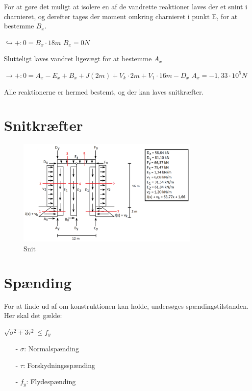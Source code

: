 For at gøre det muligt at isolere en af de vandrette reaktioner laves der et snint i charnieret, og derefter tages der moment omkring charnieret i punkt E, for at bestemme $B_x$.
\begin{center}
	$\hookrightarrow+: 0 = B_x \cdot 18m$
	\newline
	$B_x = 0N$
\end{center}

Slutteligt laves vandret ligevægt for at bestemme $A_x$
\begin{center}
	$\rightarrow+: 0 = A_x - E_x + B_x + J(2m) + V_k \cdot 2m + V_1 \cdot 16 m - D_x$
	\newline
	$A_x = -1,\!33 \cdot 10^5N$
\end{center} 

Alle reaktionerne er hermed bestemt, og der kan laves snitkræfter.

\section{Snitkræfter}

\begin{figure}[htbp]
	\centering
	\includegraphics[width=0.8\textwidth]{billeder/snitbrud.png}
	\caption{Snit}
	\label{fig:snitbrud}
\end{figure}

\section{Spænding}
For at finde ud af om konstruktionen kan holde, undersøges spændingstilstanden. Her skal det gælde:

\begin{center}
	$\sqrt{\sigma^2 + 3\tau^2} \leq f_y$ 
\end{center}

\begin{itemize}
	\item[-] $\sigma$: Normalspænding
	\item[-] $\tau$: Forskydningsspænding
	\item[-] $f_y$: Flydespænding
\end{itemize}

